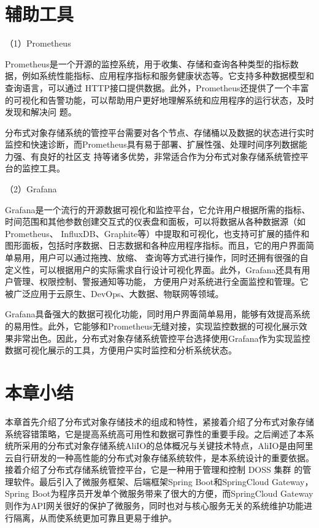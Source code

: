 \section{辅助工具}

（1）Prometheus

Prometheus是一个开源的监控系统，用于收集、存储和查询各种类型的指标数据\cite{kng2562eji}，例如系统性能指标、应用程序指标和服务健康状态等。它支持多种数据模型和查询语言，可以通过
HTTP接口提供数据。此外，Prometheus还提供了一个丰富的可视化和告警功能\cite{kongqingy2015keji}，可以帮助用户更好地理解系统和应用程序的运行状态，及时发现和解决问
题。

分布式对象存储系统的管控平台需要对各个节点、存储桶以及数据的状态进行实时监控和快速诊断，而Prometheus具有易于部署、扩展性强、处理时间序列数据能力强、有良好的社区支
持等诸多优势，非常适合作为分布式对象存储系统管控平台的监控工具。

（2）Grafana

Grafana是一个流行的开源数据可视化和监控平台，它允许用户根据所需的指标、时间范围和其他参数创建交互式的仪表盘和面板\cite{koing2keji}，可以将数据从各种数据源（如Prometheus、
InfluxDB、Graphite等）中提取和可视化，也支持可扩展的插件和图形面板，包括时序数据、日志数据和各种应用程序指标。而且，它的用户界面简单易用，用户可以通过拖拽、放缩、
查询等方式进行操作，同时还拥有很强的自定义性，可以根据用户的实际需求自行设计可视化界面。此外，Grafana还具有用户管理、权限控制、警报通知等功能，
方便用户对系统进行全面监控和管理\cite{koi56keji}。它被广泛应用于云原生、DevOps、大数据、物联网等领域。


Grafana具备强大的数据可视化功能，同时用户界面简单易用，能够有效提高系统的易用性。此外，它能够和Prometheus无缝对接，实现监控数据的可视化展示效果非常出色。因此，分布式对象存储系统管控平台选择使用Grafana作为实现监控数据可视化展示的工具，方便用户实时监控和分析系统状态。
\section{本章小结}

本章首先介绍了分布式对象存储技术的组成和特性，紧接着介绍了分布式对象存储系统容错策略，它是提高系统高可用性和数据可靠性的重要手段。之后阐述了本系统所采用的分布式对象存储系统AliIO的总体概况与关键技术特点，AliIO是由阿里云自行研发的一种高性能的分布式对象存储系统软件，是本系统设计的重要依据。接着介绍了分布式存储系统管控平台，它是一种用于管理和控制 DOSS 集群
的管理软件。最后引入了微服务框架、后端框架Spring Boot和SpringCloud Gateway，Spring Boot为程序员开发单个微服务带来了很大的方便，而SpringCloud Gateway则作为API网关很好的保护了微服务，同时也对与核心服务无关的系统维护功能进行隔离，从而使系统更加可靠且更易于维护。

